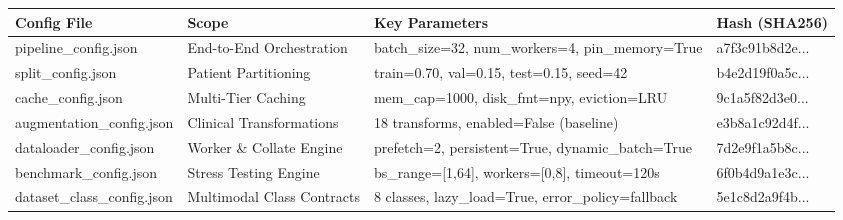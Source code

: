 \begin{tabular}{llll}
\toprule
Config File & Scope & Key Parameters & Hash (SHA256) \\
\midrule
pipeline\_config.json & End-to-End Orchestration & batch\_size=32, num\_workers=4, pin\_memory=True & a7f3c91b8d2e... \\
split\_config.json & Patient Partitioning & train=0.70, val=0.15, test=0.15, seed=42 & b4e2d19f0a5c... \\
cache\_config.json & Multi-Tier Caching & mem\_cap=1000, disk\_fmt=npy, eviction=LRU & 9c1a5f82d3e0... \\
augmentation\_config.json & Clinical Transformations & 18 transforms, enabled=False (baseline) & e3b8a1c92d4f... \\
dataloader\_config.json & Worker \& Collate Engine & prefetch=2, persistent=True, dynamic\_batch=True & 7d2e9f1a5b8c... \\
benchmark\_config.json & Stress Testing Engine & bs\_range=[1,64], workers=[0,8], timeout=120s & 6f0b4d9a1e3c... \\
dataset\_class\_config.json & Multimodal Class Contracts & 8 classes, lazy\_load=True, error\_policy=fallback & 5e1c8d2a9f4b... \\
\bottomrule
\end{tabular}
